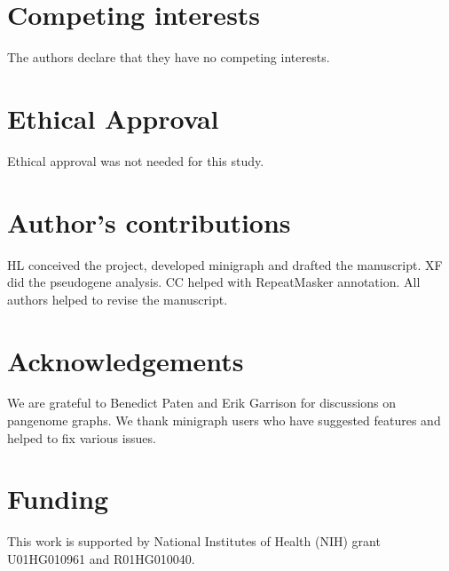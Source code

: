 \documentclass[twocolumn]{bmcart}
\begin{document}
\begin{backmatter}

\section*{Competing interests}
The authors declare that they have no competing interests.

\section*{Ethical Approval}
Ethical approval was not needed for this study.

\section*{Author's contributions}
HL conceived the project, developed minigraph and drafted the manuscript.
XF did the pseudogene analysis. CC helped with RepeatMasker annotation.
All authors helped to revise the manuscript.

\section*{Acknowledgements}
We are grateful to Benedict Paten and Erik Garrison for discussions on
pangenome graphs. We thank minigraph users who have suggested features and
helped to fix various issues.

\section*{Funding}
This work is supported by National Institutes of Health (NIH) grant
U01HG010961 and R01HG010040.


\end{backmatter}
\end{document}
